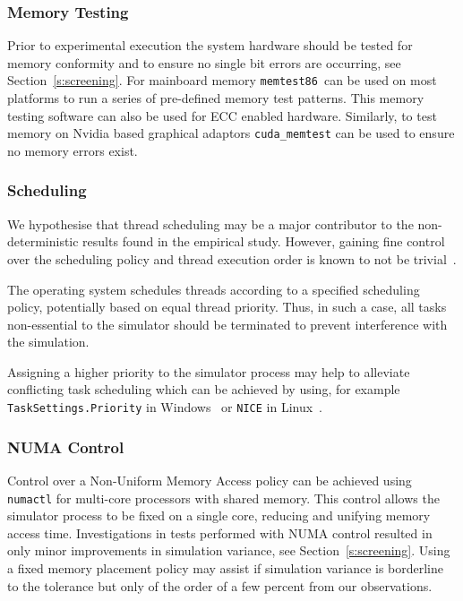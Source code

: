 \documentclass[letterpaper, 10 pt, journal, twoside]{IEEEtran}
\begin{document}
\subsubsection{Memory Testing}
Prior to experimental execution the system hardware should be tested for memory conformity and to ensure no single bit errors are occurring, see Section~\ref{s:screening}. For mainboard memory \texttt{memtest86}\ can be used on most platforms to run a series of pre-defined memory test patterns. This memory testing software can also be used for ECC enabled hardware. Similarly, to test memory on Nvidia based graphical adaptors \texttt{cuda\_memtest} can be used to ensure no memory errors exist.


\subsubsection{Scheduling}
We hypothesise that thread scheduling may be a major contributor to the non-deterministic results found in the empirical study. However, gaining fine control over the scheduling policy and thread execution order is known to not be trivial~\cite{acm-q-rr-interview}. 

The operating system schedules threads according to a specified scheduling policy, potentially based on equal thread priority. Thus, in such a case, all tasks non-essential to the simulator should be terminated to prevent interference with the simulation. 

Assigning a higher priority to the simulator process may help to alleviate conflicting task scheduling which can be achieved by using, for example \texttt{TaskSettings.Priority} in Windows~\cite{TaskSettingWindows} or \texttt{NICE} in Linux~\cite{Nice_linux}.

\subsubsection{NUMA Control}
Control over a Non-Uniform Memory Access policy can be achieved using \texttt{numactl} for multi-core processors with shared memory. This control allows the simulator process to be fixed on a single core, reducing and unifying memory access time.
%
Investigations in tests performed with NUMA control resulted in only minor improvements in simulation variance, see Section~\ref{s:screening}. 
%
%
Using a fixed memory placement policy may assist if simulation variance is borderline to the tolerance but only of the order of a few percent from our observations.
\end{document}
